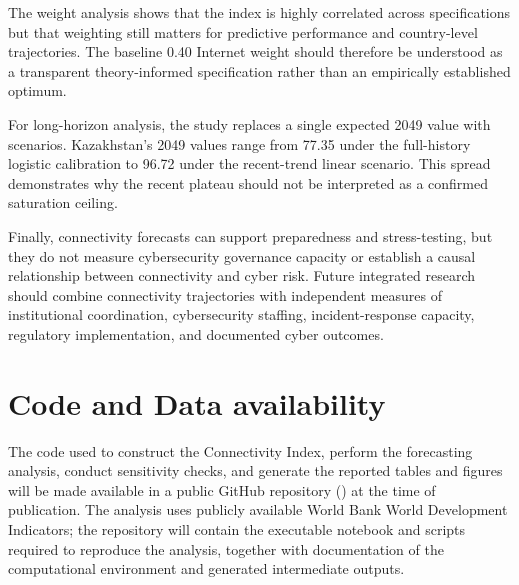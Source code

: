 \documentclass[conference]{IEEEtran}
\begin{document}
The weight analysis shows that the index is highly correlated across specifications but that weighting still matters for predictive performance and country-level trajectories. The baseline 0.40 Internet weight should therefore be understood as a transparent theory-informed specification rather than an empirically established optimum.

For long-horizon analysis, the study replaces a single expected 2049 value with scenarios. Kazakhstan's 2049 values range from 77.35 under the full-history logistic calibration to 96.72 under the recent-trend linear scenario. This spread demonstrates why the recent plateau should not be interpreted as a confirmed saturation ceiling.

Finally, connectivity forecasts can support preparedness and stress-testing, but they do not measure cybersecurity governance capacity or establish a causal relationship between connectivity and cyber risk. Future integrated research should combine connectivity trajectories with independent measures of institutional coordination, cybersecurity staffing, incident-response capacity, regulatory implementation, and documented cyber outcomes.

\section{Code and Data availability}

The code used to construct the Connectivity Index, perform the forecasting analysis, conduct sensitivity checks, and generate the reported tables and figures will be made available in a public GitHub repository () at the time of publication. The analysis uses publicly available World Bank World Development Indicators; the repository will contain the executable notebook and scripts required to reproduce the analysis, together with documentation of the computational environment and generated intermediate outputs.
\end{document}

